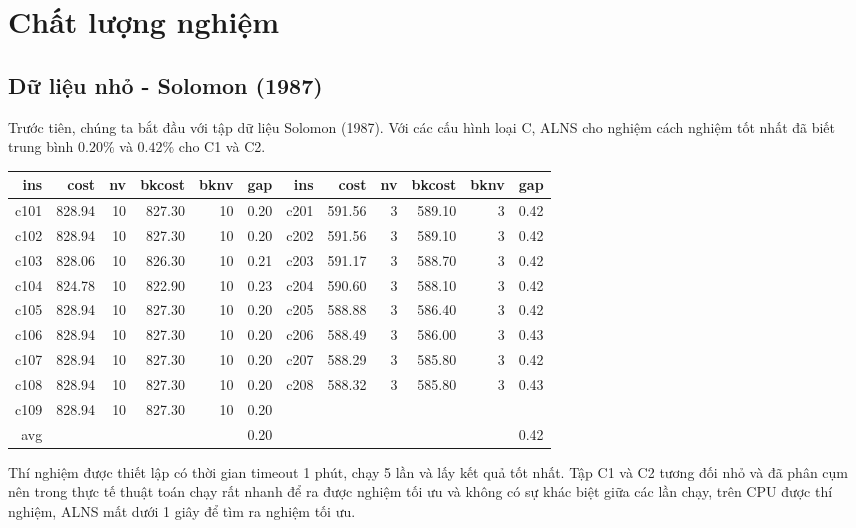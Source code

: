 \section{Chất lượng nghiệm}

\subsection{Dữ liệu nhỏ - Solomon (1987)}

Trước tiên, chúng ta bắt đầu với tập dữ liệu Solomon (1987). Với các cấu hình loại C, ALNS cho nghiệm cách nghiệm tốt nhất đã biết trung bình $0.20\%$ và $0.42\%$ cho C1 và C2. 

\begin{table}[caption={Kết quả đo với tập Solomon C \\
  \scriptsize \textit{ins: cấu hình, cost: chi phí thu được với ALNS, nv: số xe được sử dụng, bkcost: chi phí tốt nhất đã biết, bknv: số xe tốt nhất đã biết, gap (\%): khoảng cách so với nghiệm tốt nhất đã biết}}, label=exp:solomonC]
  \begin{adjustbox}{width=1\textwidth}
  \small
  \begin{tabularx}{\textwidth}{rrrrrrrrrrrr}
  \hline
  ins & cost & nv & bkcost & bknv & gap & ins & cost & nv & bkcost & bknv & gap \\ \hline
  c101 & 828.94 & 10 & 827.30 & 10 & 0.20 & c201 & 591.56 & 3 & 589.10 & 3 & 0.42 \\ \hline
  c102 & 828.94 & 10 & 827.30 & 10 & 0.20 & c202 & 591.56 & 3 & 589.10 & 3 & 0.42 \\ \hline
  c103 & 828.06 & 10 & 826.30 & 10 & 0.21 & c203 & 591.17 & 3 & 588.70 & 3 & 0.42 \\ \hline
  c104 & 824.78 & 10 & 822.90 & 10 & 0.23 & c204 & 590.60 & 3 & 588.10 & 3 & 0.42 \\ \hline
  c105 & 828.94 & 10 & 827.30 & 10 & 0.20 & c205 & 588.88 & 3 & 586.40 & 3 & 0.42 \\ \hline
  c106 & 828.94 & 10 & 827.30 & 10 & 0.20 & c206 & 588.49 & 3 & 586.00 & 3 & 0.43 \\ \hline
  c107 & 828.94 & 10 & 827.30 & 10 & 0.20 & c207 & 588.29 & 3 & 585.80 & 3 & 0.42 \\ \hline
  c108 & 828.94 & 10 & 827.30 & 10 & 0.20 & c208 & 588.32 & 3 & 585.80 & 3 & 0.43 \\ \hline
  c109 & 828.94 & 10 & 827.30 & 10 & 0.20 &  &  &  &  &  &  \\ \hline
  avg & & & & & 0.20 &  &  &  &  & & 0.42 \\ \hline
  \end{tabularx}
  \end{adjustbox}
  \end{table}
  Thí nghiệm được thiết lập có thời gian timeout 1 phút, chạy 5 lần và lấy kết quả tốt nhất. Tập C1 và C2 tương đối nhỏ và đã phân cụm nên trong thực tế thuật toán chạy rất nhanh để ra được nghiệm tối ưu và không có sự khác biệt giữa các lần chạy, trên CPU được thí nghiệm, ALNS mất dưới 1 giây để tìm ra nghiệm tối ưu.


